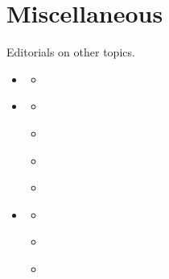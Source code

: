 \documentclass[letterpaper,10pt,english]{jupyterBook}
\begin{document}
\chapter{Miscellaneous}
\label{\detokenize{Sections/other:miscellaneous}}\label{\detokenize{Sections/other::doc}}
\sphinxAtStartPar
Editorials on other topics.
\begin{itemize}
\item {} 
\sphinxAtStartPar
{\hyperref[\detokenize{Sections/racescience::doc}]{}}
\begin{itemize}
\item {} 
\sphinxAtStartPar
{\hyperref[\detokenize{Volumes/02/04/races::doc}]{}}

\end{itemize}

\item {} 
\sphinxAtStartPar
{\hyperref[\detokenize{Sections/criminal_justice::doc}]{}}
\begin{itemize}
\item {} 
\sphinxAtStartPar
{\hyperref[\detokenize{Volumes/15/03/thirteen::doc}]{}}

\item {} 
\sphinxAtStartPar
{\hyperref[\detokenize{Volumes/19/04/crime::doc}]{}}

\item {} 
\sphinxAtStartPar
{\hyperref[\detokenize{Volumes/32/01/crime::doc}]{}}

\item {} 
\sphinxAtStartPar
{\hyperref[\detokenize{Volumes/39/04/courts_and_jails::doc}]{}}

\end{itemize}

\item {} 
\sphinxAtStartPar
{\hyperref[\detokenize{Sections/intermarriage::doc}]{}}
\begin{itemize}
\item {} 
\sphinxAtStartPar
{\hyperref[\detokenize{Volumes/05/04/intermarriage::doc}]{}}

\item {} 
\sphinxAtStartPar
{\hyperref[\detokenize{Volumes/19/03/sex_equality::doc}]{}}

\item {} 
\sphinxAtStartPar
{\hyperref[\detokenize{Volumes/31/05/correspondence::doc}]{}}


\end{itemize}
\end{itemize}
\end{document}
